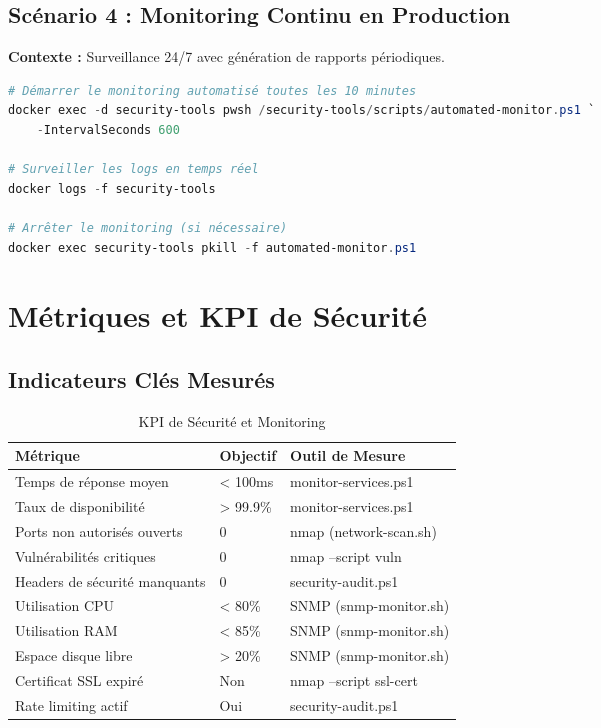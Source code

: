 \subsection{Scénario 4 : Monitoring Continu en Production}
\textbf{Contexte :} Surveillance 24/7 avec génération de rapports périodiques.

\begin{lstlisting}[language=PowerShell, caption=Lancement du Monitoring Continu]
# Démarrer le monitoring automatisé toutes les 10 minutes
docker exec -d security-tools pwsh /security-tools/scripts/automated-monitor.ps1 `
    -IntervalSeconds 600

# Surveiller les logs en temps réel
docker logs -f security-tools

# Arrêter le monitoring (si nécessaire)
docker exec security-tools pkill -f automated-monitor.ps1
\end{lstlisting}

\section{Métriques et KPI de Sécurité}

\subsection{Indicateurs Clés Mesurés}

\begin{table}[H]
\centering
\caption{KPI de Sécurité et Monitoring}
\label{tab:security_kpis}
\begin{tabular}{|p{5cm}|p{3cm}|p{5cm}|}
\hline
\textbf{Métrique} & \textbf{Objectif} & \textbf{Outil de Mesure} \\
\hline
Temps de réponse moyen & < 100ms & monitor-services.ps1 \\
\hline
Taux de disponibilité & > 99.9\% & monitor-services.ps1 \\
\hline
Ports non autorisés ouverts & 0 & nmap (network-scan.sh) \\
\hline
Vulnérabilités critiques & 0 & nmap --script vuln \\
\hline
Headers de sécurité manquants & 0 & security-audit.ps1 \\
\hline
Utilisation CPU & < 80\% & SNMP (snmp-monitor.sh) \\
\hline
Utilisation RAM & < 85\% & SNMP (snmp-monitor.sh) \\
\hline
Espace disque libre & > 20\% & SNMP (snmp-monitor.sh) \\
\hline
Certificat SSL expiré & Non & nmap --script ssl-cert \\
\hline
Rate limiting actif & Oui & security-audit.ps1 \\
\hline
\end{tabular}
\end{table}

